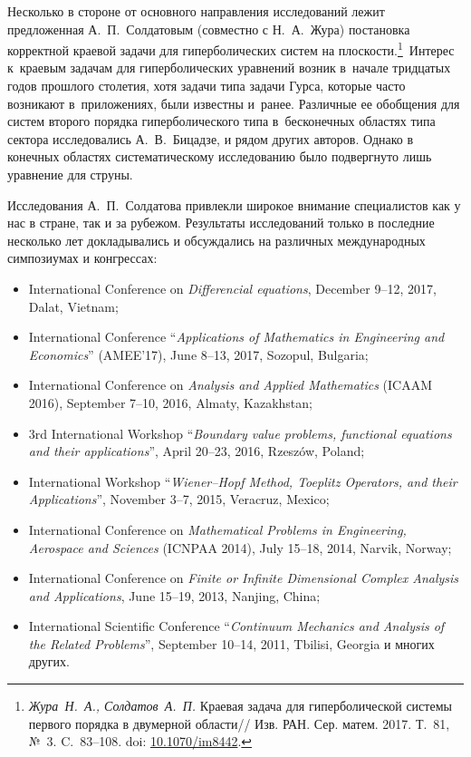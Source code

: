Несколько в стороне от основного направления исследований лежит предложенная А.~П.~Солдатовым (совместно с Н.~А.~Жура) постановка корректной краевой задачи для гиперболических систем на 
плоскости.\!\footnote{{\textit{Жура~Н.~А., Солдатов~А.~П.} Краевая задача для гиперболической системы первого порядка в двумерной области/\!/ Изв. РАН. Сер. матем. 2017. Т.~81, №~3. C.~83–108.} doi: \href{http://doi.org/10.1070/im8442}{10.1070/im8442}.}\!\!~Интерес к~краевым задачам для гиперболических уравнений возник в~начале тридцатых годов прошлого столетия, хотя задачи типа задачи Гурса, которые часто возникают в~приложениях, были известны и~ранее. 
Различные ее обобщения для систем второго порядка гиперболического типа в~бесконечных областях типа сектора исследовались А.~В.~Бицадзе,  и рядом других авторов. Однако в конечных областях систематическому исследованию было подвергнуто лишь уравнение для струны. 

Исследования А.~П.~Солдатова привлекли широкое внимание специалистов как у нас в стране, так и за рубежом. Результаты исследований только в последние несколько лет докладывались и обсуждались на различных международных симпозиумах и конгрессах:
\begin{itemize}
\item International Conference on {\it Differencial equations}, December 9--12, 2017, Dalat, 
Vietnam;

\item[--] International Conference ``{\it Applications of Mathematics in Engineering and Economics}'' (AMEE'17), June 8--13,  2017, Sozopul, Bulgaria; 
\item[--] International Conference on {\it Analysis and Applied Mathematics} (ICAAM 2016), September 7--10, 2016, Almaty, Kazakhstan; 
\item[--] 
3rd International Workshop  ``{\it Boundary value problems, functional equations and their applications}'', April 20--23, 2016, Rzesz\'ow,  Poland;
\item[--] International Workshop ``{\it Wiener--Hopf Method, Toeplitz Operators, and their Applications}'',
November 3--7, 2015,  Veracruz, Mexico;
\item[--] International Conference on {\it Mathematical Problems in Engineering, Aero\-space and Sciences} (ICNPAA 2014), July 15–18, 2014, Narvik, Norway;

\item[--] International Conference on {\it Finite or Infinite Dimensional Complex Analysis and Applications},
June 15--19, 2013, Nanjing, China;
\item[--] International Scientific Conference ``{\it Continuum Mechanics and Analysis of the Related Problems}'', September 10--14, 2011, Tbilisi, Georgia и многих других.

\end{itemize}

